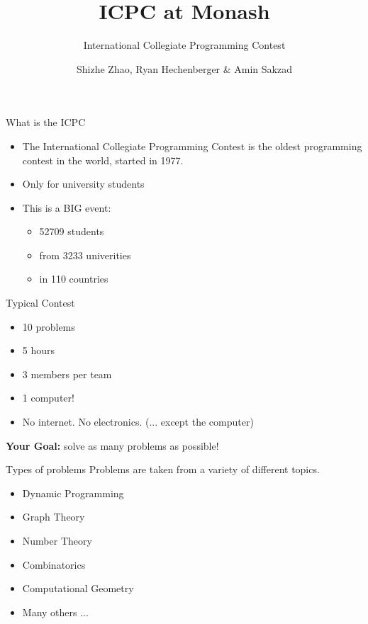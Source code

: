 \documentclass{beamer}
\title[ICPC at Monash]{ICPC at Monash}
\subtitle {International Collegiate Programming Contest}
\date{}
\author[Shizhe Zhao, Ryan Hechenberger \& Amin Sakzad ]{
  Shizhe Zhao, Ryan Hechenberger \& Amin Sakzad
}
\begin{document}

\frame{\titlepage}

\begin{frame}{What is the ICPC}
  \begin{itemize}
    \item The {\color{red}\Large I}nternational 
              {\color{red}\Large C}ollegiate 
              {\color{red}\Large P}rogramming 
              {\color{red}\Large C}ontest is the oldest programming contest in the world, started in 1977.
    \item Only for university students
    \item This is a BIG event:
      \begin{itemize}
        \item 52709 students
        \item from 3233 univerities
        \item in 110 countries
      \end{itemize}
  \end{itemize}
\end{frame}

\begin{frame}{Typical Contest}
  \begin{itemize}
    \item 10 problems
    \item 5 hours
    \item 3 members per team
    \item 1 computer!
    \item No internet. No electronics. (... except the computer)
  \end{itemize}
  \begin{center}
  \LARGE{\textbf{Your Goal:}} solve as many problems as possible!
  \end{center}
\end{frame}

\begin{frame}{Types of problems}
  Problems are taken from a variety of different topics.
  \begin{itemize}
    \item Dynamic Programming
    \item Graph Theory
    \item Number Theory
    \item Combinatorics
    \item Computational Geometry
    \item Many others ...
  \end{itemize}
\end{frame}
\end{document}
